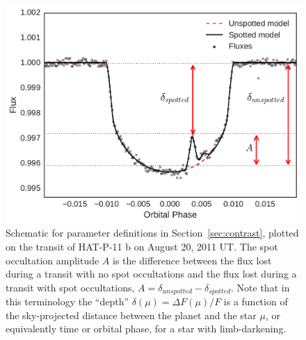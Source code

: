 \documentclass[iop]{emulateapj}
\begin{document}


\begin{figure}
\centering
\includegraphics[scale=0.4]{figures/contrast_schematic.pdf}
\caption{Schematic for parameter definitions in Section~\ref{sec:contrast}, plotted on the transit of HAT-P-11 b on August 20, 2011 UT. The spot occultation amplitude $A$ is the difference between the flux lost during a transit with no spot occultations and the flux lost during a transit with spot occultations, $A = \delta_{unspotted} - \delta_{spotted}$. Note that in this terminology the ``depth'' $\delta(\mu) = \Delta F(\mu)/F$ is a function of the sky-projected distance between the planet and the star $\mu$, or equivalently time or orbital phase, for a star with limb-darkening.}
\label{fig:contrast_schematic}
\end{figure}
\end{document}
